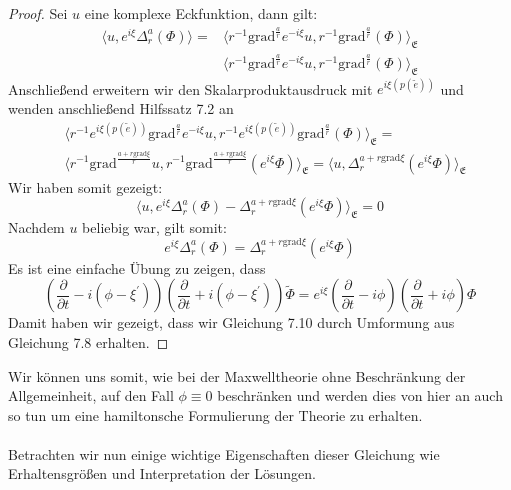 \documentclass[11pt,a4paper,leqno]{report}
\numberwithin{equation}{chapter}
\begin{document}
\begin{proof}
	Sei $u$ eine komplexe Eckfunktion, dann gilt:
	\begin{align*}
		\langle u, e^{i\xi}\Delta_r^a(\Phi)\rangle = &\langle r^{-1}\text{grad}^{\frac{a}{r}}e^{-i\xi}u, r^{-1}\text{grad}^{\frac{a}{r}}(\Phi)\rangle_{\mathfrak{E}}\\
		&\langle r^{-1}\text{grad}^{\frac{a}{r}}e^{-i\xi}u, r^{-1}\text{grad}^{\frac{a}{r}}(\Phi)\rangle_{\mathfrak{E}}
	\end{align*}
	Anschlie\ss{}end erweitern wir den Skalarproduktausdruck mit $e^{i\xi(p(\tilde{e}))}$ und wenden anschlie\ss{}end Hilfssatz 7.2 an
	\begin{align*}
		&\langle r^{-1}e^{i\xi(p(\tilde{e}))}\text{grad}^{\frac{a}{r}}e^{-i\xi}u, r^{-1}e^{i\xi(p(\tilde{e}))}\text{grad}^{\frac{a}{r}}(\Phi)\rangle_{\mathfrak{E}}=\\
		&\langle r^{-1}\text{grad}^{\frac{a + r\text{grad}\xi}{r}}u, r^{-1}\text{grad}^{\frac{a + r\text{grad}\xi}{r}}(e^{i\xi}\Phi)\rangle_{\mathfrak{E}}=
		\langle u, \Delta_r^{a + r\text{grad}\xi}(e^{i\xi}\Phi)\rangle_{\mathfrak{E}}
	\end{align*}
	Wir haben somit gezeigt:
	\begin{equation*}
		\langle u, e^{i\xi}\Delta_r^a(\Phi) - \Delta_r^{a + r\text{grad}\xi}(e^{i\xi}\Phi)\rangle_{\mathfrak{E}} = 0
	\end{equation*}
	Nachdem $u$ beliebig war, gilt somit:
	\begin{equation*}
		e^{i\xi}\Delta_r^a(\Phi) = \Delta_r^{a + r\text{grad}\xi}(e^{i\xi}\Phi)
	\end{equation*}
	Es ist eine einfache \"Ubung zu zeigen, dass 
	\begin{equation*}
		(\frac{\partial}{\partial t} - i(\phi-\xi^\prime))(\frac{\partial}{\partial t} + i(\phi-\xi^\prime))\tilde{\Phi} = e^{i\xi}(\frac{\partial}{\partial t} - i\phi)(\frac{\partial}{\partial t} + i\phi)\Phi
	\end{equation*}
	Damit haben wir gezeigt, dass wir Gleichung 7.10 durch Umformung aus Gleichung 7.8 erhalten.
\end{proof}
\noindent
Wir k\"onnen uns somit, wie bei der Maxwelltheorie ohne Beschr\"ankung der Allgemeinheit, auf den Fall $\phi\equiv 0$ beschr\"anken und werden dies von hier an auch so tun um eine hamiltonsche Formulierung der Theorie zu erhalten.\\
\\ 
Betrachten wir nun einige wichtige Eigenschaften dieser Gleichung wie Erhaltensgr\"o\ss{}en und Interpretation der L\"osungen.
\end{document}
